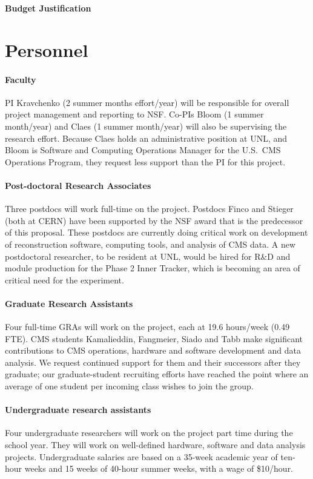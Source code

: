 \documentclass[11pt]{article}
\begin{document}
\begin{center}
{\Large \bf Budget Justification}\\
\end{center}

\section{Personnel} 

\paragraph{Faculty} PI Kravchenko (2 summer months effort/year) will be
responsible for overall project management and reporting to NSF.  Co-PIs
Bloom (1 summer month/year) and Claes (1 summer month/year) will also be supervising the research effort.  Because Claes
holds an administrative position at UNL, and Bloom is Software and
Computing Operations Manager for the U.S.~CMS Operations Program, they
request less support than the PI for this project.

\paragraph{Post-doctoral Research Associates} Three postdocs will work
full-time on the project.  Postdocs Finco and Stieger (both at CERN) have
been supported by the NSF award that is the predecessor of this proposal.
These postdocs are currently doing critical work on development of
reconstruction software, computing tools, and analysis of CMS data. A new postdoctoral researcher, to be resident at UNL, would be hired for R\&D and module production for the Phase 2 Inner Tracker, which is becoming an area of critical need for the experiment.

\paragraph{Graduate Research Assistants} Four full-time GRAs will work on
the project, each at 19.6 hours/week (0.49 FTE).  CMS students Kamalieddin, Fangmeier, Siado and Tabb make
significant contributions to CMS operations, hardware and software
development and data analysis.  We request continued support for them and
their successors after they graduate; our graduate-student recruiting
efforts have reached the point where an average of one student per incoming
class wishes to join the group.

\paragraph{Undergraduate research assistants} Four undergraduate
researchers will work on the project part time during the school year.  They
will work on well-defined hardware, software and data analysis
projects.  Undergraduate salaries are based on a 35-week academic year of ten-hour weeks and 15 weeks of 40-hour summer weeks, with a wage of \$10/hour.
\end{document}
